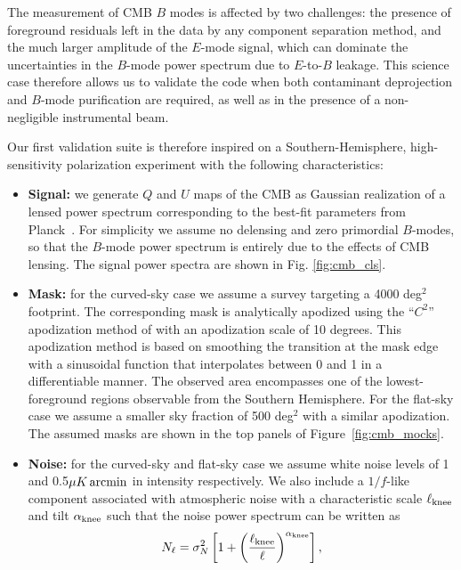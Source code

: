\documentclass[usenatbib]{mnrasb}
\begin{document}
        The measurement of CMB $B$ modes is affected by two challenges: the presence of foreground residuals left in the data by any component separation method, and the much larger amplitude of the $E$-mode signal, which can dominate the uncertainties in the $B$-mode power spectrum due to $E$-to-$B$ leakage. This science case therefore allows us to validate the code when both contaminant deprojection and $B$-mode purification are required, as well as in the presence of a non-negligible instrumental beam.
        
        Our first validation suite is therefore inspired on a Southern-Hemisphere, high-sensitivity polarization experiment with the following characteristics:
        \begin{itemize}
          \item {\bf Signal:} we generate $Q$ and $U$ maps of the CMB as Gaussian realization of a lensed power spectrum corresponding to the best-fit parameters from Planck~\citep{2016A&A...594A..13P}. For simplicity we assume no delensing and zero primordial $B$-modes, so that the $B$-mode power spectrum is entirely due to the effects of CMB lensing. The signal power spectra are shown in Fig. \ref{fig:cmb_cls}.
          \item {\bf Mask:} for the curved-sky case we assume a survey targeting a 4000 deg$^2$ footprint. The corresponding mask is analytically apodized using the ``$C^2$'' apodization method of \cite{2009PhRvD..79l3515G} with an apodization scale of 10 degrees. This apodization method is based on smoothing the transition at the mask edge with a sinusoidal function that interpolates between 0 and 1 in a differentiable manner. The observed area encompasses one of the lowest-foreground regions observable from the Southern Hemisphere. For the flat-sky case we assume a smaller sky fraction of 500 deg$^2$ with a similar apodization. The assumed masks are shown in the top panels of Figure~\ref{fig:cmb_mocks}.
          \item {\bf Noise:} for the curved-sky and flat-sky case we assume white noise levels of 1 and 0.5$\mu K\,{\rm arcmin}$ in intensity respectively. We also include a $1/f$-like component associated with atmospheric noise with a characteristic scale $\ell_{\rm knee}$ and tilt $\alpha_{\rm knee}$ such that the noise power spectrum can be written as
          \begin{equation}
            N_\ell=\sigma_N^2\left[1+\left(\frac{\ell_{\rm knee}}{\ell}\right)^{\alpha_{\rm knee}}\right],
          \end{equation}

\end{itemize}
\end{document}
